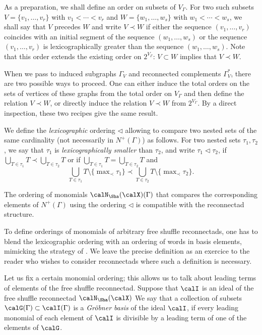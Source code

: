 As a preparation, we shall define an order on subsets of $V_{\Gamma}$. For two such subsets $V=\{v_1,\ldots,v_r\}$ with $v_1<\cdots<v_r$ and $W=\{w_1,\ldots,w_s\}$ with $w_1<\cdots<w_s$, we shall say that $V$ precedes $W$ and write $V\prec W$ if either the sequence $(v_1,\ldots,v_r)$ coincides with an initial segment of the sequence $(w_1,\ldots,w_s)$ or the sequence $(v_1,\ldots,v_r)$ is lexicographically greater than the sequence $(w_1,\ldots,w_s)$. Note that this order extends the existing order on $2^{V_\Gamma}$: $V\subset W$ implies that $V\prec W$. 

When we pass to induced subgraphs $\Gamma_V$ and reconnected complements $\Gamma^*_V$, there are two possible ways to proceed. One can either induce the total orders on the sets of vertices of these graphs from the total order on $V_\Gamma$ and then define the relation $V\prec W$, or directly induce the relation $V\prec W$ from $2^{V_\Gamma}$. By a direct inspection, these two recipes give the same result. 

We define the \emph{lexicographic} ordering $\triangleleft$ allowing to compare two nested sets of the same cardinality (not necessarily in $N^+(\Gamma)$) as follows. For two nested sets $\tau_1,\tau_2$, we say that $\tau_1$ is \emph{lexicographically smaller} than $\tau_2$, and write $\tau_1 \triangleleft \tau_2$, if $\bigcup_{T\in \tau_1} T \prec \bigcup_{T\in \tau_2} T$ or if $\bigcup_{T\in \tau_1} T = \bigcup_{T\in \tau_2} T$ and 
 \[
\bigcup_{T\in \tau_1} T\setminus \{\max\nolimits_{\prec} \tau_1\} \prec \bigcup_{T\in \tau_2} T\setminus \{\max\nolimits_{\prec} \tau_2\}.
 \]
 
\begin{prop}
The ordering of monomials $\calN_{\Sha}(\calX)(\Gamma)$ that compares the corresponding elements of $N^+(\Gamma)$ using the ordering $\triangleleft$  is compatible with the reconnectad structure.
\end{prop}

To define orderings of monomials of arbitrary free shuffle reconnectads, one has to blend the lexicographic ordering with an ordering of words in basis elements, mimicking the strategy of \cite{MR4114993}. We leave the precise definition as an exercice to the reader who wishes to consider reconnectads where such a definition is necessary. 

Let us fix a certain monomial ordering; this allows us to talk about leading terms of elements of the free shuffle reconnectad. Suppose that $\calI$ is an ideal of the free shuffle reconnectad $\calN_{\Sha}(\calX)$ We say that a collection of subsets $\calG(\Gamma)\subset\calI(\Gamma)$ is a \emph{Gr\"obner basis} of the ideal $\calI$, if every leading monomial of each element of $\calI$ is divisible by a leading term of one of the elements of $\calG$. 

